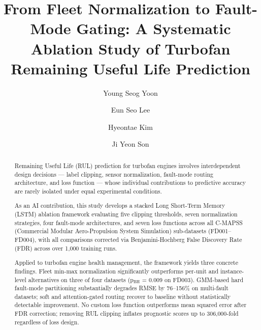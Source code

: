 \documentclass[preprint,10pt]{elsarticle}
\begin{document}
\begin{frontmatter}

\title{From Fleet Normalization to Fault-Mode Gating: A Systematic Ablation Study of Turbofan Remaining Useful Life Prediction}

\author[inst1]{Young Seog Yoon}

\author[inst1]{Eun Seo Lee}

\author[inst1]{Hyeontae Kim}

\author[inst2]{Ji Yeon Son}



\begin{abstract}
Remaining Useful Life (RUL) prediction for turbofan engines involves interdependent design decisions --- label clipping, sensor normalization, fault-mode routing architecture, and loss function --- whose individual contributions to predictive accuracy are rarely isolated under equal experimental conditions.

As an AI contribution, this study develops a stacked Long Short-Term Memory (LSTM) ablation framework evaluating five clipping thresholds, seven normalization strategies, four fault-mode architectures, and seven loss functions across all C-MAPSS (Commercial Modular Aero-Propulsion System Simulation) sub-datasets (FD001--FD004), with all comparisons corrected via Benjamini-Hochberg False Discovery Rate (FDR) across over 1,000 training runs.

Applied to turbofan engine health management, the framework yields three concrete findings. Fleet min-max normalization significantly outperforms per-unit and instance-level alternatives on three of four datasets (p$_\text{BH}$ = 0.009 on FD003). GMM-based hard fault-mode partitioning substantially degrades RMSE by 76--156\% on multi-fault datasets; soft and attention-gated routing recover to baseline without statistically detectable improvement. No custom loss function outperforms mean squared error after FDR correction; removing RUL clipping inflates prognostic scores up to 306,000-fold regardless of loss design.


\end{abstract}
\end{frontmatter}
\end{document}
